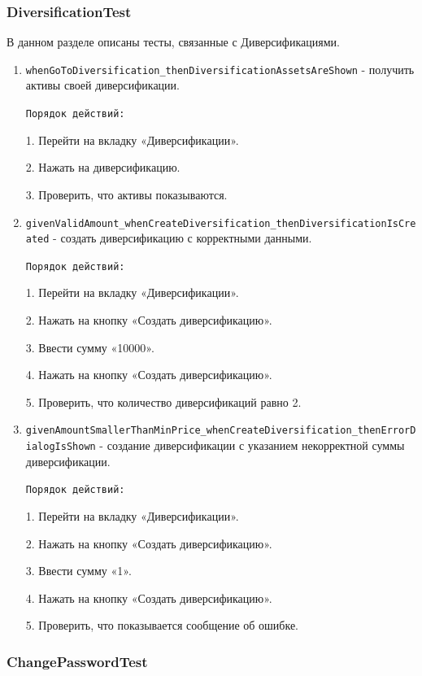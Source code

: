 \documentclass[a4paper, 14pt]{article}
\begin{document}
\subsubsection{DiversificationTest}

В данном разделе описаны тесты, связанные с Диверсификациями.

\begin{enumerate}
    \item \texttt{whenGoToDiversification\_thenDiversificationAssetsAreShown} - получить активы своей диверсификации.

    \texttt{Порядок действий:}
    
    1. Перейти на вкладку «Диверсификации».
    
    2. Нажать на диверсификацию.

    3. Проверить, что активы показываются.
    \item \texttt{givenValidAmount\_whenCreateDiversification\_thenDiversificationIsCreated} - создать диверсификацию с корректными данными.

    \texttt{Порядок действий:}
    
    1. Перейти на вкладку «Диверсификации».
    
    2. Нажать на кнопку «Создать диверсификацию».

    3. Ввести сумму «10000».

    4. Нажать на кнопку «Создать диверсификацию».

    5. Проверить, что количество диверсификаций равно 2.
    \item \texttt{givenAmountSmallerThanMinPrice\_whenCreateDiversification\_thenErrorDialogIsShown} - создание диверсификации с указанием некорректной суммы диверсификации.

    \texttt{Порядок действий:}
    
    1. Перейти на вкладку «Диверсификации».
    
    2. Нажать на кнопку «Создать диверсификацию».

    3. Ввести сумму «1».

    4. Нажать на кнопку «Создать диверсификацию».

    5. Проверить, что показывается сообщение об ошибке.
    
\end{enumerate}

\subsubsection{ChangePasswordTest}
\end{document}
